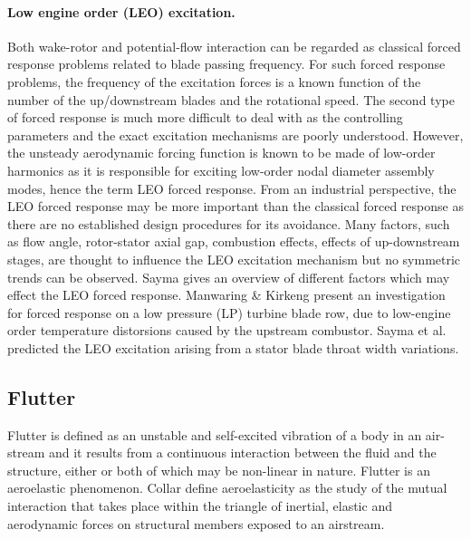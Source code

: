 \paragraph{Low engine order (LEO) excitation.}
%
 Both wake-rotor and potential-flow interaction can be regarded
 as classical forced response problems related to blade passing frequency.
 For such forced response problems, the frequency of the excitation forces
 is a known function of the number of the up/downstream blades and the
 rotational speed.
 The second type of forced response is much more difficult to deal with as
 the controlling parameters and the exact excitation mechanisms are poorly   understood.
 However, the unsteady aerodynamic forcing function is known to be made of  low-order harmonics as it is responsible for exciting low-order nodal diameter
 assembly modes, hence the term LEO forced response.
 From an industrial perspective, the LEO forced response may be more important than
 the classical forced response as there are no established design procedures
 for its avoidance.
 Many factors, such as flow angle, rotor-stator axial gap, combustion effects,
 effects of up-downstream stages, are thought to influence the LEO
 excitation mechanism but no symmetric trends can be observed.
 Sayma \citeyear{Mehdi:4} gives an overview of different factors which may
 effect the LEO forced response.
 Manwaring \& Kirkeng \citeyear{Manwaring:2} present an investigation
 for forced response on a low pressure (LP) turbine blade row, due to low-engine
 order temperature distorsions caused by the upstream combustor.
 Sayma et al. \citeyear{Mehdi:7} predicted the LEO excitation
 arising from a stator blade throat width variations.
%
%
\subsection{Flutter}
%
 Flutter is defined as an unstable and self-excited vibration of a body in an
 air-stream and it results from a continuous interaction between the fluid and
 the structure, either or both of which may be non-linear in nature.
 Flutter is an aeroelastic phenomenon.
 Collar \citeyear{Collar:1} define aeroelasticity as the
 study of the mutual interaction that takes place within the triangle
 of inertial, elastic and aerodynamic forces on structural members exposed to
 an airstream.

